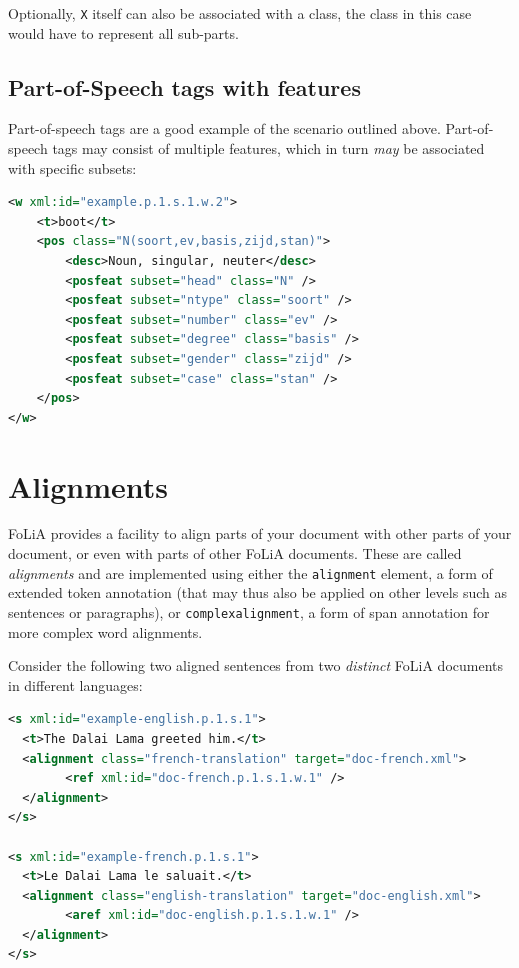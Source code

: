 \documentclass[a4paper,12pt]{report}
\begin{document}
Optionally, \texttt{X} itself can also be associated with a class, the class in this case would have to represent all sub-parts.

\subsection{Part-of-Speech tags with features}
\label{sec:posfeat}

Part-of-speech tags are a good example of the scenario outlined above. Part-of-speech tags may consist of multiple features, which in turn \emph{may} be associated with specific subsets:

\begin{lstlisting}[language=xml]
<w xml:id="example.p.1.s.1.w.2">
    <t>boot</t>
    <pos class="N(soort,ev,basis,zijd,stan)">
        <desc>Noun, singular, neuter</desc>
        <posfeat subset="head" class="N" />
        <posfeat subset="ntype" class="soort" />
        <posfeat subset="number" class="ev" />
        <posfeat subset="degree" class="basis" />
        <posfeat subset="gender" class="zijd" />
        <posfeat subset="case" class="stan" />
    </pos>
</w>
\end{lstlisting}

\section{Alignments}

FoLiA provides a facility to align parts of your document with other parts of your document, or even with parts of other FoLiA documents. These are called \emph{alignments} and are implemented using either the \texttt{alignment} element, a form of extended token annotation (that may thus also be applied on other levels such as sentences or paragraphs), or \texttt{complexalignment}, a form of span annotation for more complex word alignments.

Consider the following two aligned sentences from two \emph{distinct} FoLiA documents in different languages:

\begin{lstlisting}[language=xml]
<s xml:id="example-english.p.1.s.1">
  <t>The Dalai Lama greeted him.</t>
  <alignment class="french-translation" target="doc-french.xml">
        <ref xml:id="doc-french.p.1.s.1.w.1" />
  </alignment>
</s>

<s xml:id="example-french.p.1.s.1">
  <t>Le Dalai Lama le saluait.</t>
  <alignment class="english-translation" target="doc-english.xml">
        <aref xml:id="doc-english.p.1.s.1.w.1" />
  </alignment>
</s>
\end{lstlisting}
\end{document}
